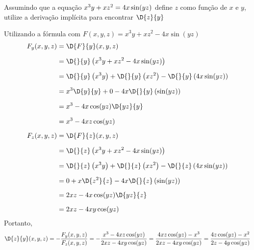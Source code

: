 \documentclass[a4paper,12pt,fleqn]{article}
\begin{document}
Assumindo que a equação
\(
  x^3y + xz^2 = 4x\sin(yz)
  \vphantom{\int}
\)
define $z$ como função de $x$ e $y$,
utilize a derivação implícita para encontrar \(\D{z}{y}\)

\begin{answer}
  Utilizando a fórmula com \(F(x, y, z) = x^3y + xz^2 - 4x\sin(yz)\)
  \begin{align*}
    F_y(x, y, z)
    & = \D{F}{y}(x, y, z) \\[2mm]
    & = \D{}{y} \left(x^3y + xz^2 - 4x\sin(yz)\right) \\[2mm]
    & = \D{}{y} \left(x^3y\right) + \D{}{y} \left(xz^2\right) - \D{}{y} \left(4x\sin(yz)\right) \\[2mm]
    & = x^3\D{y}{y} + 0 - 4x\D{}{y} \left(\sin(yz)\right) \\[2mm]
    & = x^3 - 4x\cos(yz)\D{yz}{y} \\[2mm]
    & = x^3 - 4xz\cos(yz) \\[2mm]
    F_z(x, y, z)
    & = \D{F}{z}(x, y, z) \\[2mm]
    & = \D{}{z} \left(x^3y + xz^2 - 4x\sin(yz)\right) \\[2mm]
    & = \D{}{z} \left(x^3y\right) + \D{}{z} \left(xz^2\right) - \D{}{z} \left(4x\sin(yz)\right) \\[2mm]
    & = 0 + x\D{z^2}{z} - 4x\D{}{z} \left(\sin(yz)\right) \\[2mm]
    & = 2xz - 4x\cos(yz)\D{yz}{z} \\[2mm]
    & = 2xz - 4xy\cos(yz)
  \end{align*}
  Portanto,
  \[
  \D{z}{y}(x, y, z)
  = -\frac{F_y(x, y, z)}{F_z(x, y, z)}
  = -\frac{x^3 - 4xz\cos(yz)}{2xz - 4xy\cos(yz)}
  = \frac{4xz\cos(yz)-x^3}{2xz - 4xy\cos(yz)}
  = \frac{4z\cos(yz)-x^2}{2z - 4y\cos(yz)}
  \]
\end{answer}

\end{document}
